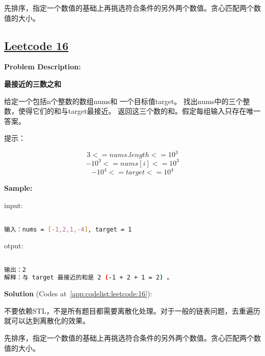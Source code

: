 先排序，指定一个数值的基础上再挑选符合条件的另外两个数值。贪心匹配两个数值的大小。\par



\subsection{\href{https://leetcode-cn.com/}{Leetcode 16}}\label{app:problemlist:leetcode:16}

\textbf{Problem Description:}\par

\textbf{最接近的三数之和}\par

给定一个包括n个整数的数组nums和 一个目标值target。
找出nums中的三个整数，使得它们的和与target最接近。
返回这三个数的和。假定每组输入只存在唯一答案。\par

提示：\par

$$ 3 <= nums.length <= 10^{3} $$
$$ -10^{3} <= nums[i] <= 10^{3} $$
$$ -10^{4} <= target <= 10^{4} $$


\textbf{Sample:}\par

input:\par

\begin{lstlisting}[language=bash]

输入：nums = [-1,2,1,-4], target = 1


\end{lstlisting}

otput:\par

\begin{lstlisting}[language=bash]

输出：2
解释：与 target 最接近的和是 2 (-1 + 2 + 1 = 2) 。


\end{lstlisting}

\textbf{Solution }(Codes at~\ref{app:codelist:leetcode:16}):\par

不要依赖STL，不是所有题目都需要离散化处理。对于一般的链表问题，去重遍历就可以达到离散化的效果。\par

先排序，指定一个数值的基础上再挑选符合条件的另外两个数值。贪心匹配两个数值的大小。\par



